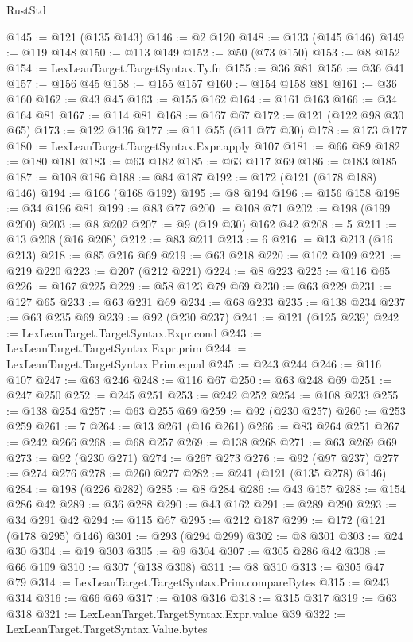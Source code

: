 \begin{lexlean}{RustStd}
\begin{coremodule}
@145 := @121 (@135 @143)
@146 := @2 @120
@148 := @133 (@145 @146)
@149 := @119 @148
@150 := @113 @149
@152 := @50 (@73 @150)
@153 := @8 @152
@154 := LexLeanTarget.TargetSyntax.Ty.fn
@155 := @36 @81
@156 := @36 @41
@157 := @156 @45
@158 := @155 @157
@160 := @154 @158 @81
@161 := @36 @160
@162 := @43 @45
@163 := @155 @162
@164 := @161 @163
@166 := @34 @164 @81
@167 := @114 @81
@168 := @167 @67
@172 := @121 (@122 @98 @30 @65)
@173 := @122 @136
@177 := @11 @55 (@11 @77 @30)
@178 := @173 @177
@180 := LexLeanTarget.TargetSyntax.Expr.apply @107
@181 := @66 @89
@182 := @180 @181
@183 := @63 @182
@185 := @63 @117 @69
@186 := @183 @185
@187 := @108 @186
@188 := @84 @187
@192 := @172 (@121 (@178 @188) @146)
@194 := @166 (@168 @192)
@195 := @8 @194
@196 := @156 @158
@198 := @34 @196 @81
@199 := @83 @77
@200 := @108 @71
@202 := @198 (@199 @200)
@203 := @8 @202
@207 := @9 (@19 @30) @162 @42
@208 := 5
@211 := @13 @208 (@16 @208)
@212 := @83 @211
@213 := 6
@216 := @13 @213 (@16 @213)
@218 := @85 @216 @69
@219 := @63 @218
@220 := @102 @109
@221 := @219 @220
@223 := @207 (@212 @221)
@224 := @8 @223
@225 := @116 @65
@226 := @167 @225
@229 := @58 @123 @79 @69
@230 := @63 @229
@231 := @127 @65
@233 := @63 @231 @69
@234 := @68 @233
@235 := @138 @234
@237 := @63 @235 @69
@239 := @92 (@230 @237)
@241 := @121 (@125 @239)
@242 := LexLeanTarget.TargetSyntax.Expr.cond
@243 := LexLeanTarget.TargetSyntax.Expr.prim
@244 := LexLeanTarget.TargetSyntax.Prim.equal
@245 := @243 @244
@246 := @116 @107
@247 := @63 @246
@248 := @116 @67
@250 := @63 @248 @69
@251 := @247 @250
@252 := @245 @251
@253 := @242 @252
@254 := @108 @233
@255 := @138 @254
@257 := @63 @255 @69
@259 := @92 (@230 @257)
@260 := @253 @259
@261 := 7
@264 := @13 @261 (@16 @261)
@266 := @83 @264 @251
@267 := @242 @266
@268 := @68 @257
@269 := @138 @268
@271 := @63 @269 @69
@273 := @92 (@230 @271)
@274 := @267 @273
@276 := @92 (@97 @237)
@277 := @274 @276
@278 := @260 @277
@282 := @241 (@121 (@135 @278) @146)
@284 := @198 (@226 @282)
@285 := @8 @284
@286 := @43 @157
@288 := @154 @286 @42
@289 := @36 @288
@290 := @43 @162
@291 := @289 @290
@293 := @34 @291 @42
@294 := @115 @67
@295 := @212 @187
@299 := @172 (@121 (@178 @295) @146)
@301 := @293 (@294 @299)
@302 := @8 @301
@303 := @24 @30
@304 := @19 @303
@305 := @9 @304
@307 := @305 @286 @42
@308 := @66 @109
@310 := @307 (@138 @308)
@311 := @8 @310
@313 := @305 @47 @79
@314 := LexLeanTarget.TargetSyntax.Prim.compareBytes
@315 := @243 @314
@316 := @66 @69
@317 := @108 @316
@318 := @315 @317
@319 := @63 @318
@321 := LexLeanTarget.TargetSyntax.Expr.value @39
@322 := LexLeanTarget.TargetSyntax.Value.bytes

\end{coremodule}
\end{lexlean}

